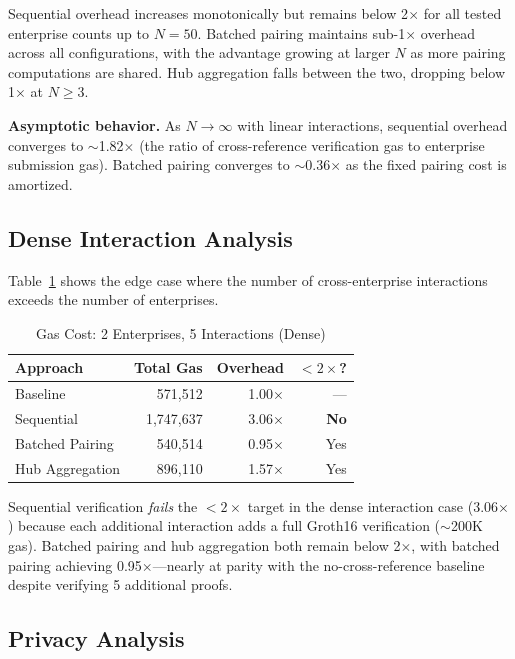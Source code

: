 Sequential overhead increases monotonically but remains below 2$\times$ for
all tested enterprise counts up to $N = 50$. Batched pairing maintains sub-1$\times$
overhead across all configurations, with the advantage growing at larger $N$
as more pairing computations are shared. Hub aggregation falls between the two,
dropping below 1$\times$ at $N \geq 3$.

\textbf{Asymptotic behavior.} As $N \to \infty$ with linear interactions,
sequential overhead converges to $\sim$1.82$\times$ (the ratio of
cross-reference verification gas to enterprise submission gas). Batched
pairing converges to $\sim$0.36$\times$ as the fixed pairing cost is amortized.

\subsection{Dense Interaction Analysis}

Table~\ref{tab:dense} shows the edge case where the number of cross-enterprise
interactions exceeds the number of enterprises.

\begin{table}[t]
\centering
\caption{Gas Cost: 2 Enterprises, 5 Interactions (Dense)}
\label{tab:dense}
\begin{tabular}{@{}lrrr@{}}
\toprule
Approach & Total Gas & Overhead & $< 2\times$? \\
\midrule
Baseline & 571,512 & 1.00$\times$ & --- \\
Sequential & 1,747,637 & 3.06$\times$ & \textbf{No} \\
Batched Pairing & 540,514 & 0.95$\times$ & Yes \\
Hub Aggregation & 896,110 & 1.57$\times$ & Yes \\
\bottomrule
\end{tabular}
\end{table}

Sequential verification \emph{fails} the $< 2\times$ target in the dense
interaction case (3.06$\times$) because each additional interaction adds a
full Groth16 verification ($\sim$200K gas). Batched pairing and hub
aggregation both remain below 2$\times$, with batched pairing achieving
0.95$\times$---nearly at parity with the no-cross-reference baseline despite
verifying 5 additional proofs.

\subsection{Privacy Analysis}

